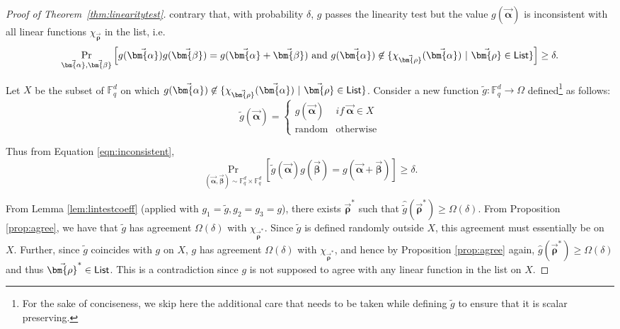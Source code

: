 \documentclass[11pt]{article}
\newcommand{\F}{\mathbb{F}}
\renewcommand{\le}{ \leqslant}
\newcommand{\alphab}{\vec{\bm{\alpha}}}
\newcommand{\betab}{\vec{\bm{\beta}}}
\renewcommand{\tilde}{\widetilde}
\newcommand{\rhob}{\vec{\bm{\rho}}}
\begin{document}
\begin{proof}[Proof of Theorem~\ref{thm:linearitytest}]
contrary that, with probability $\delta$, $g$ passes the linearity test but the value $g(\alphab)$ is inconsistent with all linear
functions $\chi_{\rhob}$ in the list, i.e. 
%
%
%
\begin{equation} \label{eqn:inconsistent}
\Pr_{\alphab,\betab } \left[ g(\alphab) g(\betab)= g(\alphab+\betab) \ \mbox{and} \ g(\alphab) \not\in \{ \chi_{\rhob}(\alphab) ~| ~ 
\rhob \in {\sf List} \}    
\right] \geq \delta.
\end{equation} 

Let $X$ be the subset of $\F_q^d$ on which $g(\alphab) \not\in \{ \chi_{\rhob}(\alphab) ~| ~
\rhob \in {\sf List} \}$. Consider a new function $\tilde{g}:\F_q^d\to\Omega$ defined\footnote{For the sake of conciseness, we skip here the additional care that needs to be taken while defining  $\tilde{g}$ to ensure that it is scalar preserving. } as follows:
$$
\tilde{g}(\alphab)=\begin{cases}
g(\alphab) & if \ \alphab\in X\\
\text{random} & \text{otherwise}
\end{cases}
$$

Thus from Equation \eqref{eqn:inconsistent}, 
$$\Pr_{(\alphab,\betab)\sim \F_q^d\times\F_q^d}[\tilde{g}(\alphab)g(\betab)=g(\alphab+\betab)] \geq \delta.$$

From Lemma \ref{lem:lintestcoeff} (applied with $g_1 = \tilde{g}, g_2=g_3=g$), 
there exists $\rhob^*$ such that $\hat{\tilde{g}}(\rhob^*) \geq \Omega(\delta)$. From 
Proposition \ref{prop:agree}, we have that $\tilde{g}$ has agreement $\Omega(\delta)$ with $\chi_{\rhob^*}$. Since $\tilde{g}$ is defined randomly
outside $X$, this agreement must essentially be on $X$. Further, since  $\tilde{g}$ coincides with $g$ on $X$, $g$ has agreement  $\Omega(\delta)$ 
with $\chi_{\rhob^*}$, and 
hence  by Proposition \ref{prop:agree} again, 
 $\hat{g}(\rhob^*) \geq \Omega(\delta)$ and thus $\rhob^* \in {\sf List}$. This is a contradiction since
$g$ is not supposed to agree with any linear function in the list on $X$.


\end{proof}
\end{document}

